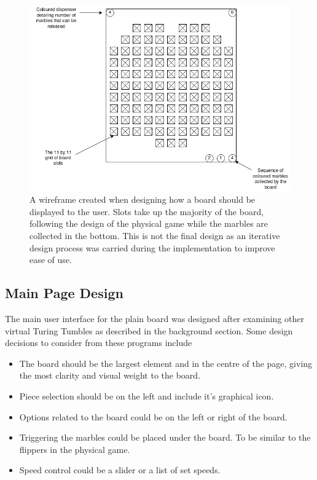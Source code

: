 \documentclass{l4proj}
\begin{document}
\begin{figure}
    \centering
    \includegraphics[width=0.6\linewidth]{images/boardWireframe.png}
    \caption{A wireframe created when designing how a board should be displayed to the user. Slots take up the majority of the board, following the design of the physical game while the marbles are collected in the bottom. This is not the final design as an iterative design process was carried during the implementation to improve ease of use.}
    \label{fig:boardWireframe}
\end{figure}

\subsection{Main Page Design}
The main user interface for the plain board was designed after examining other virtual Turing Tumbles as described in the background section. Some design decisions to consider from these programs include
\begin{itemize}
    \item The board should be the largest element and in the centre of the page, giving the most clarity and visual weight to the board.
    \item Piece selection should be on the left and include it's graphical icon.
    \item Options related to the board could be on the left or right of the board.
    \item Triggering the marbles could be placed under the board. To be similar to the flippers in the physical game.
    \item Speed control could be a slider or a list of set speeds.
\end{itemize}
\end{document}
